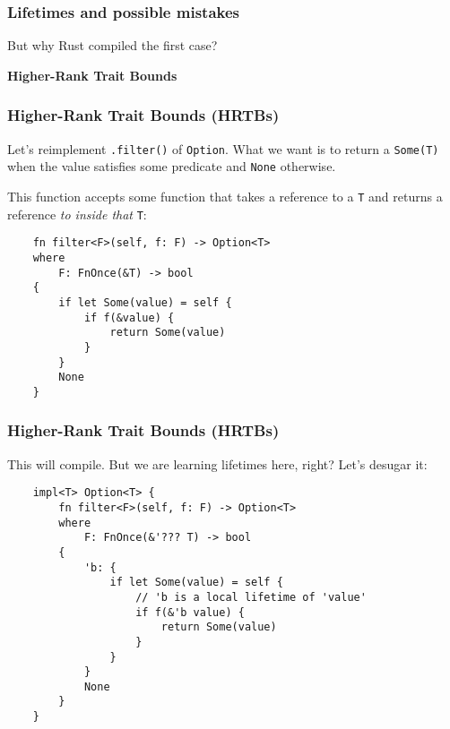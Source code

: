 \documentclass[aspectratio=1610,t]{beamer}
\begin{document}
\begin{frame}[fragile]
\frametitle{Lifetimes and possible mistakes}
But why Rust compiled the first case?

\end{frame}


\begin{frame}[c]
\centering\Huge\textbf{Higher-Rank Trait Bounds}
\end{frame}


\begin{frame}[fragile]
\frametitle{Higher-Rank Trait Bounds (HRTBs)}
Let's reimplement \texttt{.filter()} of \texttt{Option}. What we want is to return a \texttt{Some(T)} when the value satisfies some predicate and \texttt{None} otherwise.

This function accepts some function that takes a reference to a \texttt{T} and returns a reference \textit{to inside that} \texttt{T}:

\begin{verbatim}
    fn filter<F>(self, f: F) -> Option<T>
    where
        F: FnOnce(&T) -> bool
    {
        if let Some(value) = self {
            if f(&value) {
                return Some(value)
            }
        }
        None
    }
\end{verbatim}
\end{frame}


\begin{frame}[fragile,c]
\frametitle{Higher-Rank Trait Bounds (HRTBs)}
This will compile. But we are learning lifetimes here, right? Let's desugar it:

\begin{verbatim}
    impl<T> Option<T> {
        fn filter<F>(self, f: F) -> Option<T>
        where
            F: FnOnce(&'??? T) -> bool
        {
            'b: {
                if let Some(value) = self {
                    // 'b is a local lifetime of 'value'
                    if f(&'b value) {
                        return Some(value)
                    }
                }
            }
            None
        }
    }
\end{verbatim}
\end{frame}
\end{document}
